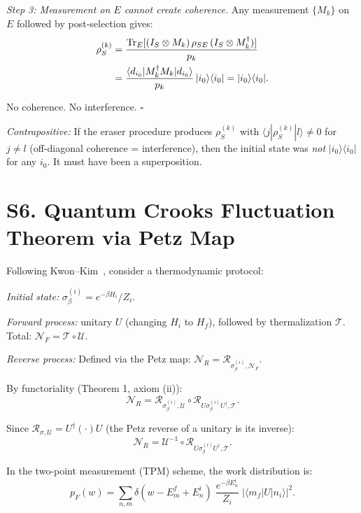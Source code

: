 \documentclass[prl,twocolumn,superscriptaddress,longbibliography]{revtex4-2}
\newcommand{\Tr}{\mathrm{Tr}}
\newcommand{\Petz}{\mathcal{R}}
\newcommand{\chan}{\mathcal{N}}
\newcommand{\ket}[1]{|#1\rangle}
\newcommand{\bra}[1]{\langle#1|}
\newcommand{\abs}[1]{\left|#1\right|}
\begin{document}
\emph{Step 3: Measurement on $E$ cannot create coherence.}
Any measurement $\{M_k\}$ on $E$ followed by post-selection gives:
\begin{align}
\rho_S^{(k)} &= \frac{\Tr_E[(I_S \otimes M_k)\,\rho_{SE}\,
  (I_S \otimes M_k^\dagger)]}{p_k} \notag\\
&= \frac{\bra{d_{i_0}}M_k^\dagger M_k\ket{d_{i_0}}}{p_k}\,
  \ket{i_0}\bra{i_0} = \ket{i_0}\bra{i_0}.
\end{align}

No coherence. No interference. \hfill$\square$

\emph{Contrapositive:} If the eraser procedure produces
$\rho_S^{(k)}$ with $\bra{j}\rho_S^{(k)}\ket{l} \neq 0$ for $j \neq l$
(off-diagonal coherence = interference), then the initial state was
\emph{not} $\ket{i_0}\bra{i_0}$ for any $i_0$. It must have been a
superposition.

\section{S6. Quantum Crooks Fluctuation Theorem via Petz Map}
\label{sec:crooks}

Following Kwon--Kim~\cite{Kwon2019}, consider a thermodynamic protocol:

\emph{Initial state:} $\sigma_\beta^{(i)} = e^{-\beta H_i}/Z_i$.

\emph{Forward process:} unitary $U$ (changing $H_i$ to $H_f$), followed
by thermalization $\mathcal{T}$. Total: $\chan_F = \mathcal{T} \circ
\mathcal{U}$.

\emph{Reverse process:} Defined via the Petz map:
$\chan_R = \Petz_{\sigma_\beta^{(i)}, \chan_F}$.

By functoriality (Theorem 1, axiom (ii)):
\begin{equation}
\chan_R = \Petz_{\sigma_\beta^{(i)}, \mathcal{U}} \circ
\Petz_{U\sigma_\beta^{(i)}U^\dagger, \mathcal{T}}.
\end{equation}

Since $\Petz_{\sigma, \mathcal{U}} = U^\dagger(\cdot)U$ (the Petz
reverse of a unitary is its inverse):
\begin{equation}
\chan_R = \mathcal{U}^{-1} \circ
\Petz_{U\sigma_\beta^{(i)}U^\dagger, \mathcal{T}}.
\end{equation}

In the two-point measurement (TPM) scheme, the work distribution is:
\begin{equation}
p_F(w) = \sum_{n,m} \delta(w - E_m^f + E_n^i)\;
\frac{e^{-\beta E_n^i}}{Z_i}\;\abs{\bra{m_f}U\ket{n_i}}^2.
\end{equation}
\end{document}
